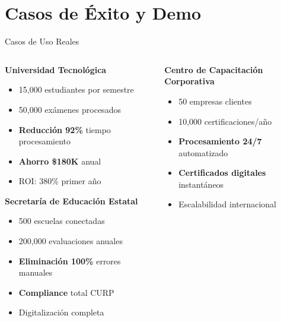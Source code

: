 \documentclass[aspectratio=169,11pt]{beamer}
\begin{document}
\section{Casos de Éxito y Demo}

\begin{frame}{Casos de Uso Reales}
    \begin{columns}
        \begin{column}{0.5\textwidth}
            \textbf{\textcolor{jazzblue}{Universidad Tecnológica}}
            \begin{itemize}
                \item 15,000 estudiantes por semestre
                \item 50,000 exámenes procesados
                \item \textbf{Reducción 92\%} tiempo procesamiento
                \item \textbf{Ahorro \$180K} anual
                \item ROI: 380\% primer año
            \end{itemize}
            
            \vspace{0.5cm}
            \textbf{\textcolor{jazzgreen}{Secretaría de Educación Estatal}}
            \begin{itemize}
                \item 500 escuelas conectadas
                \item 200,000 evaluaciones anuales
                \item \textbf{Eliminación 100\%} errores manuales
                \item \textbf{Compliance} total CURP
                \item Digitalización completa
            \end{itemize}
        \end{column}
        \begin{column}{0.5\textwidth}
            \textbf{\textcolor{jazzorange}{Centro de Capacitación Corporativa}}
            \begin{itemize}
                \item 50 empresas clientes
                \item 10,000 certificaciones/año
                \item \textbf{Procesamiento 24/7} automatizado
                \item \textbf{Certificados digitales} instantáneos
                \item Escalabilidad internacional
            \end{itemize}
            

\end{column}
\end{columns}
\end{frame}
\end{document}

